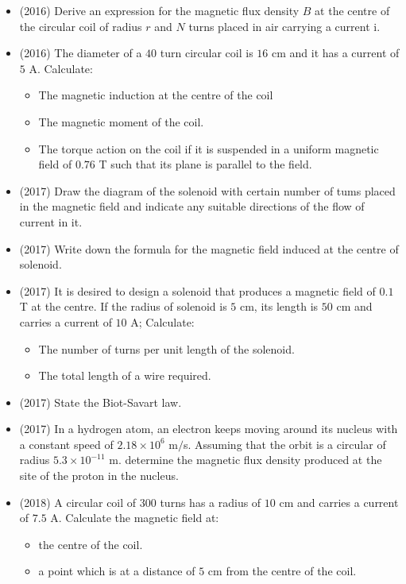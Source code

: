 \documentclass{article}
\begin{document}
\begin{itemize}
\item (2016)  Derive an expression for the magnetic flux density $ B$ at the centre of the circular coil of radius $ r$ and $ N$ turns placed in air carrying a current i.
\item (2016)  The diameter of a $ 40$ turn circular coil is $ 16$ cm and it has a current of $ 5$ A.  Calculate:\begin{itemize}
\item The magnetic induction at the centre of the coil
\item The magnetic moment of the coil.
\item The torque action on the coil if it is suspended in a uniform magnetic field of $ 0.76$ T such that its plane is parallel to the field.
\end{itemize}
\item (2017)  Draw the diagram of the solenoid with certain number of tums placed in the magnetic field and indicate any suitable directions of the flow of current in it.
\item (2017)  Write down the formula for the magnetic field induced at the centre of solenoid. 
\item (2017)  It is desired to design a solenoid that produces a magnetic field of $ 0.1$ T at the centre. If the radius of solenoid is $ 5$ cm, its length is $ 50$ cm and carries a current of $ 10$ A; Calculate:\begin{itemize}
\item The number of turns per unit length of the solenoid. 
\item The total length of a wire required. 
\end{itemize}
\item (2017)  State the Biot-Savart law. 
\item (2017)  In a hydrogen atom, an electron keeps moving around its nucleus with a constant speed of $ 2.18 \times 10^{6}$ m$/$s. Assuming that the orbit is a circular of radius $ 5.3 \times 10^{-11}$ m. determine the magnetic flux density produced at the site of the proton in the nucleus. 
\item (2018)  A circular coil of $ 300$ turns has a radius of $ 10$ cm and carries a current of $ 7.5$ A. Calculate the magnetic field at:\begin{itemize}
\item the centre of the coil. 
\item a point which is at a distance of $ 5$ cm from the centre of the coil. 
\end{itemize}

\end{itemize}
\end{document}
